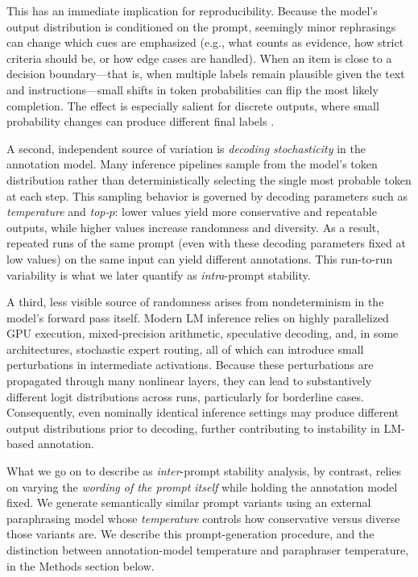 \documentclass{article}
\begin{document}
This has an immediate implication for reproducibility. Because the model's output distribution is conditioned on the prompt, seemingly minor rephrasings can change which cues are emphasized (e.g., what counts as evidence, how strict criteria should be, or how edge cases are handled). When an item is close to a decision boundary---that is, when multiple labels remain plausible given the text and instructions---small shifts in token probabilities can flip the most likely completion. The effect is especially salient for discrete outputs, where small probability changes can produce different final labels \citep{sclar2023quantifying}.

A second, independent source of variation is \emph{decoding stochasticity} in the annotation model. Many inference pipelines sample from the model's token distribution rather than deterministically selecting the single most probable token at each step. This sampling behavior is governed by decoding parameters such as \emph{temperature} and \emph{top-$p$}: lower values yield more conservative and repeatable outputs, while higher values increase randomness and diversity. As a result, repeated runs of the same prompt (even with these decoding parameters fixed at low values) on the same input can yield different annotations. This run-to-run variability is what we later quantify as \emph{intra}-prompt stability.

A third, less visible source of randomness arises from nondeterminism in the model’s forward pass itself. Modern LM inference relies on highly parallelized GPU execution, mixed-precision arithmetic, speculative decoding, and, in some architectures, stochastic expert routing, all of which can introduce small perturbations in intermediate activations. Because these perturbations are propagated through many nonlinear layers, they can lead to substantively different logit distributions across runs, particularly for borderline cases. Consequently, even nominally identical inference settings may produce different output distributions prior to decoding, further contributing to instability in LM-based annotation.

What we go on to describe as \emph{inter}-prompt stability analysis, by contrast, relies on varying the \emph{wording of the prompt itself} while holding the annotation model fixed. We generate semantically similar prompt variants using an external paraphrasing model whose \emph{temperature} controls how conservative versus diverse those variants are. We describe this prompt-generation procedure, and the distinction between annotation-model temperature and paraphraser temperature, in the Methods section below.
\end{document}
